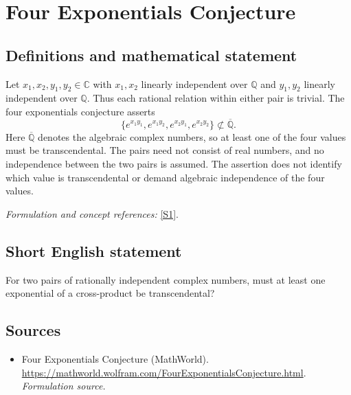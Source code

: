\documentclass[11pt]{article}
\begin{document}
\section*{\texorpdfstring{Four Exponentials Conjecture}{Four Exponentials Conjecture}}\label{373}
\subsection{Definitions and mathematical statement}
Let $x_1,x_2,y_1,y_2\in{\mathbb{C}}$ with $x_1,x_2$ linearly independent over ${\mathbb{Q}}$ and $y_1,y_2$ linearly independent over ${\mathbb{Q}}$. Thus each rational relation within either pair is trivial. The four exponentials conjecture asserts
\[
 \{e^{x_1y_1},e^{x_1y_2},e^{x_2y_1},e^{x_2y_2}\}
 \not\subset\overline{{\mathbb{Q}}}.
\]
Here $\overline{{\mathbb{Q}}}$ denotes the algebraic complex numbers, so at least one of the four values must be transcendental. The pairs need not consist of real numbers, and no independence between the two pairs is assumed. The assertion does not identify which value is transcendental or demand algebraic independence of the four values.
\par\smallskip\textit{Formulation and concept references:} \href{https://mathworld.wolfram.com/FourExponentialsConjecture.html}{[S1]}.

\subsection{Short English statement}
For two pairs of rationally independent complex numbers, must at least one exponential of a cross-product be transcendental?
\subsection{Sources}
\begin{itemize}
\item[S1]Four Exponentials Conjecture (MathWorld).
\url{https://mathworld.wolfram.com/FourExponentialsConjecture.html}.
\textit{Formulation source.}
\end{itemize}
\end{document}
